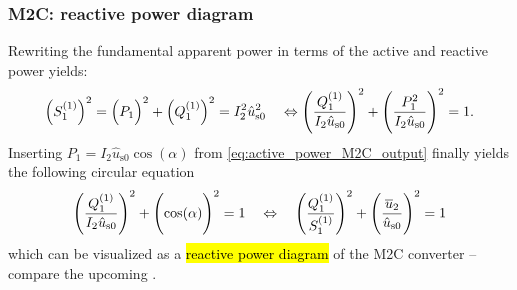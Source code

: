 \begin{frame}[c]
    \frametitle{M2C: reactive power diagram}
    Rewriting the fundamental apparent power in terms of the active and reactive power yields:
    \begin{equation}
        \left(S_1^{(1)}\right)^2 = \left(P_1\vphantom{Q_1^{(1)}}\right)^2 + \left(Q_1^{(1)}\right)^2 = I_2^2 \hat{u}^2_\mathrm{s0}  \quad \Leftrightarrow \left(\frac{Q_1^{(1)}}{I_2 \hat{u}_\mathrm{s0}}\right)^2 + \left(\frac{P_1^2}{I_2 \hat{u}_\mathrm{s0}}\vphantom{\frac{Q_1^{(1)}}{I_2 \hat{u}_\mathrm{s0}}}\right)^2 = 1.
    \end{equation}\pause
    Inserting $P_1 = I_2 \hat{u}_\mathrm{s0} \cos(\alpha)$ from \eqref{eq:active_power_M2C_output} finally yields the following circular equation
    \begin{equation}
        \left(\frac{Q_1^{(1)}}{I_2 \hat{u}_\mathrm{s0}}\right)^2 + \left(\cos(\alpha)\vphantom{\frac{Q_1^{(1)}}{I_2 \hat{u}_\mathrm{s0}}}\right)^2 = 1 \quad \Leftrightarrow \quad \left(\frac{Q_1^{(1)}}{S_1^{(1)}}\right)^2 + \left(\frac{\overline{u}_2}{\hat{u}_\mathrm{s0}}\vphantom{\frac{Q_1^{(1)}}{S_1^{(1)}}}\right)^2 = 1 
    \end{equation}
    which can be visualized as a \hl{reactive power diagram} of the M2C converter -- compare the upcoming .
\end{frame}

